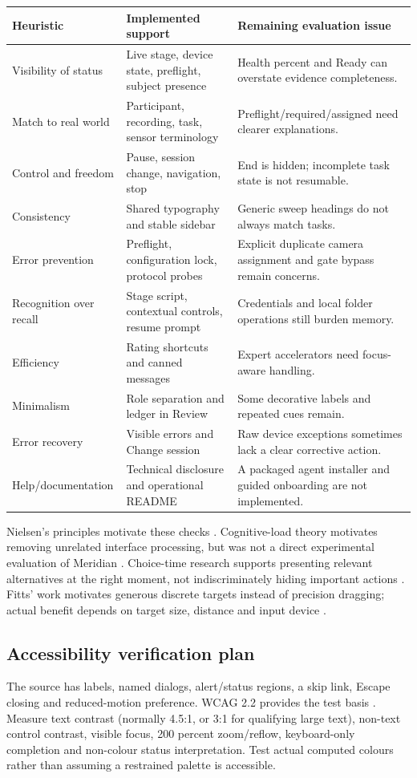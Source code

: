 \documentclass[11pt,a4paper]{article}
\begin{document}
\begin{longtable}{@{}L{.27\textwidth}L{.35\textwidth}L{.31\textwidth}@{}}
\toprule Heuristic & Implemented support & Remaining evaluation issue\\\midrule\endhead
Visibility of status & Live stage, device state, preflight, subject presence & Health percent and Ready can overstate evidence completeness.\\
Match to real world & Participant, recording, task, sensor terminology & Preflight/required/assigned need clearer explanations.\\
Control and freedom & Pause, session change, navigation, stop & End is hidden; incomplete task state is not resumable.\\
Consistency & Shared typography and stable sidebar & Generic sweep headings do not always match tasks.\\
Error prevention & Preflight, configuration lock, protocol probes & Explicit duplicate camera assignment and gate bypass remain concerns.\\
Recognition over recall & Stage script, contextual controls, resume prompt & Credentials and local folder operations still burden memory.\\
Efficiency & Rating shortcuts and canned messages & Expert accelerators need focus-aware handling.\\
Minimalism & Role separation and ledger in Review & Some decorative labels and repeated cues remain.\\
Error recovery & Visible errors and Change session & Raw device exceptions sometimes lack a clear corrective action.\\
Help/documentation & Technical disclosure and operational README & A packaged agent installer and guided onboarding are not implemented.\\
\bottomrule
\end{longtable}

Nielsen's principles motivate these checks \cite{nielsen}. Cognitive-load theory motivates removing unrelated interface processing, but was not a direct experimental evaluation of Meridian \cite{sweller}. Choice-time research supports presenting relevant alternatives at the right moment, not indiscriminately hiding important actions \cite{hick}. Fitts' work motivates generous discrete targets instead of precision dragging; actual benefit depends on target size, distance and input device \cite{fitts}.

\subsection{Accessibility verification plan}
The source has labels, named dialogs, alert/status regions, a skip link, Escape closing and reduced-motion preference. WCAG 2.2 provides the test basis \cite{wcag}. Measure text contrast (normally 4.5:1, or 3:1 for qualifying large text), non-text control contrast, visible focus, 200 percent zoom/reflow, keyboard-only completion and non-colour status interpretation. Test actual computed colours rather than assuming a restrained palette is accessible.
\end{document}
